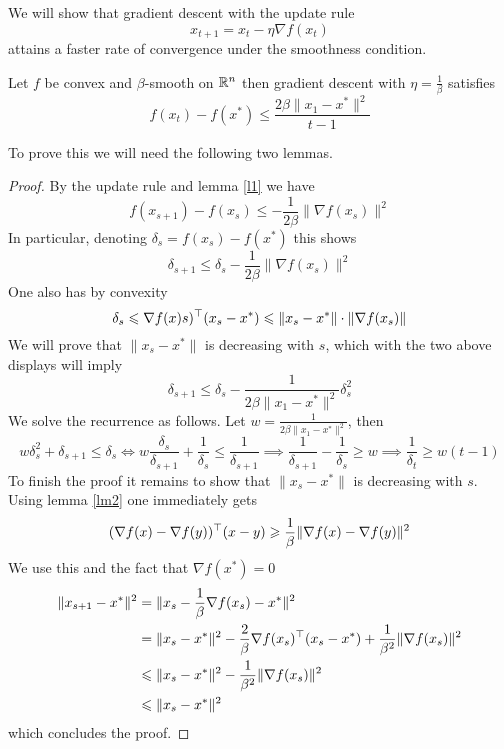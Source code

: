 We will show that gradient descent with the update rule
$$x_{t+1} = x_t - \eta \nabla f(x_t)$$
attains a faster rate of convergence under the smoothness condition.

\begin{theorem}
Let $f$ be convex and $\beta$-smooth on $\mathbb{R}^n$ then gradient descent with $\eta = \frac{1}{\beta}$ satisfies
$$f(x_t) - f(x^*) \leq \frac{2\beta\|x_1 - x^*\|^2}{t-1}$$
\end{theorem}
To prove this we will need the following two lemmas.

\begin{proof}
By the update rule and lemma \ref{l1} we have
$$f(x_{s+1}) - f(x_s) \leq -\frac{1}{2\beta}\|\nabla f(x_s)\|^2 $$
In particular, denoting $\delta_s = f(x_s) - f(x^*)$ this shows
$$\delta_{s+1} \leq \delta_s - \frac{1}{2\beta}\|\nabla f(x_s)\|^2 $$
One also has by convexity
$$\delta_s \leqslant \nabla f(x)s)^\top(x_s - x^*) \leqslant \|x_s - x^*\| \cdot \|\nabla f(x_s)\|$$
We will prove that $\|x_s - x^*\|$ is decreasing with $s$, which with the two above displays will imply
$$\delta_{s+1}\leq \delta_s - \frac{1}{2\beta\|x_1 - x^*\|^2}\delta_s^2$$
We solve the recurrence as follows.  Let $w = \frac{1}{2\beta\|x_1 - x^*\|^2}$, then
$$w\delta_s^2 + \delta_{s+1} \leq \delta_s \iff w\frac{\delta_s}{\delta_{s+1}} + \frac
{1}{\delta_s} \leq \frac{1}{\delta_{s+1}} \implies \frac{1}{\delta_{s+1}} - \frac{1}{\delta_s} \geq w \implies \frac{1}{\delta_t} \geq w(t-1)$$
To finish the proof it remains to show that $\|x_s - x^*\|$ is decreasing with $s$.  Using lemma \ref{lm2} one immediately gets
$$ (\nabla f(x) - \nabla f(y))^\top(x - y) \geqslant \frac{1}{\beta} \|\nabla f(x) - \nabla f(y)\|^2$$
We use this and the fact that $\nabla f(x^*) = 0$
\begin{align}
    \|x_{s+1} - x^*\|^2 &= \|x_s - \frac{1}{\beta}\nabla f(x_s) - x^*\|^2 \\
    &= \|x_s - x^*\|^2 - \frac{2}{\beta}\nabla f(x_s)^\top(x_s - x^*) + \frac{1}{\beta^2}\|\nabla f(x_s)\|^2 \\
    &\leqslant \|x_s - x^*\|^2 - \frac{1}{\beta^2} \|\nabla f(x_s)\|^2 \\
    &\leqslant \|x_s - x^*\|^2
\end{align}
which concludes the proof.
\end{proof}

